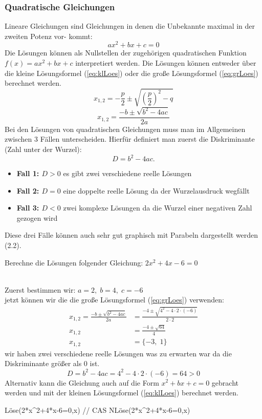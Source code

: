 \subsubsection{Quadratische Gleichungen}
Lineare Gleichungen sind Gleichungen in denen die Unbekannte maximal in der zweiten Potenz vor-
kommt:
\[
    ax^2+bx+c=0
\]
Die Lösungen können als Nullstellen der zugehörigen quadratischen Funktion \(f(x)=ax^2+bx+c\) interpretiert werden.
Die Lösungen können entweder über die kleine Lösungsformel (\ref{eq:klLoes}) oder die große Lösungsformel (\ref{eq:grLoes}) berechnet werden.
\begin{equation}\label{eq:klLoes}
    x_{1,2} = -\frac{p}{2} \pm \sqrt{\left(\frac{p}{2}\right)^2 - q}
\end{equation}
\begin{equation}\label{eq:grLoes}
    x_{1,2} = \frac{-b \pm \sqrt{b^2 - 4ac}}{2a} 
\end{equation}
Bei den Lösungen von quadratischen Gleichungen muss man im Allgemeinen zwischen 3 Fällen unterscheiden. Hierfür definiert man zuerst die Diskriminante (Zahl unter der Wurzel):
\begin{equation}
    D = b^2 - 4ac.
\end{equation}
\begin{itemize}
    \item \textbf{Fall 1: $D > 0$}    es gibt zwei verschiedene reelle Lösungen
    \item \textbf{Fall 2: $D = 0$}    eine doppelte reelle Lösung da der Wurzelausdruck wegfällt
    \item \textbf{Fall 3: $D < 0$}    zwei komplexe Lösungen da die Wurzel einer negativen Zahl gezogen wird
\end{itemize}
Diese drei Fälle können auch sehr gut graphisch mit Parabeln dargestellt werden (2.2).
\begin{aufgabe}
    Berechne die Lösungen folgender Gleichung: \(2x^{2}+4x-6=0\)
\end{aufgabe}
\begin{loesung}
    \\Zuerst bestimmen wir: \(a=2,\;b=4,\;c=-6\) \\
    jetzt können wir die die große Lösungsformel (\ref{eq:grLoes}) verwenden:
    \begin{align*}
        x_{1,2} = \frac{-b \pm \sqrt{b^2 - 4ac}}{2a} &= \frac{-4 \pm \sqrt{4^2 - 4\cdot2\cdot(-6)}}{2\cdot2} \\
        x_{1,2} &= \frac{-4 \pm \sqrt{64}}{4} \\
        x_{1,2} &= \{-3,\;1\}
    \end{align*}
    wir haben zwei verschiedene reelle Lösungen was zu erwarten war da die Diskriminante größer als 0 ist.
    \[
        D=b^2-4ac=4^2 - 4\cdot2\cdot(-6)=64>0
    \]
    Alternativ kann die Gleichung auch auf die Form \(x^2+bx+c=0\) gebracht werden und mit der kleinen Lösungsformel (\ref{eq:klLoes}) berechnet werden.
\end{loesung}
\begin{geogebracode}
    Löse(2*x^2+4*x-6=0,x) // CAS
    NLöse(2*x^2+4*x-6=0,x) 
\end{geogebracode}
\pagebreak
